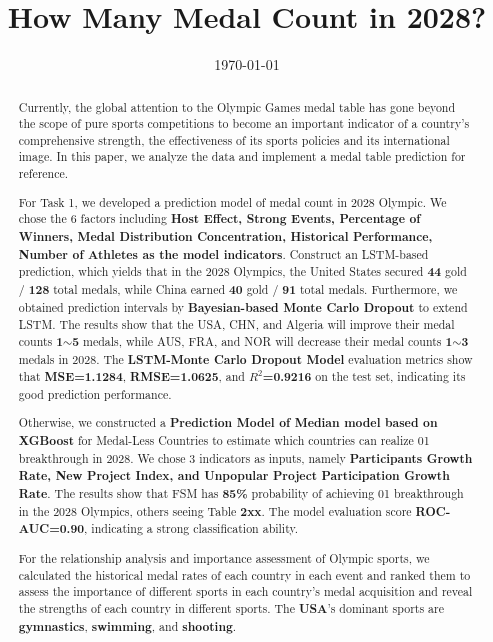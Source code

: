 \documentclass{mcmthesis}
\title{How Many Medal Count in 2028?}
\date{\today}
\begin{document}
	
	\begin{abstract}
	
	 Currently, the global attention to the Olympic Games medal table has gone beyond the scope of pure sports competitions to become an important indicator of a country's comprehensive strength, the effectiveness of its sports policies and its international image. In this paper, we analyze the data and implement a medal table prediction for reference.
	
	For Task 1, we developed a prediction model of medal count in 2028 Olympic. We chose the 6 factors including \textbf{Host Effect, Strong Events, Percentage of Winners, Medal Distribution Concentration, Historical Performance, Number of Athletes as the model indicators}. Construct an LSTM-based prediction, which yields that in the 2028 Olympics, the United States secured \textbf{44} gold / \textbf{128} total medals, while China earned \textbf{40} gold / \textbf{91} total medals. Furthermore, we obtained prediction intervals by \textbf{Bayesian-based Monte Carlo Dropout} to extend LSTM. The results show that the USA, CHN, and Algeria will improve their medal counts \textbf{1$\sim$5} medals, while AUS, FRA, and NOR will decrease their medal counts \textbf{1$\sim$3} medals in 2028. The \textbf{LSTM-Monte Carlo Dropout Model} evaluation metrics show that \textbf{MSE=1.1284}, \textbf{RMSE=1.0625}, and \textbf{$R^2$=0.9216} on the test set, indicating its good prediction performance.
	
	Otherwise, we constructed a \textbf{Prediction Model of Median model based on XGBoost} for Medal-Less Countries to estimate which countries can realize 01 breakthrough  in 2028. We chose 3 indicators as inputs, namely \textbf{Participants Growth Rate, New Project Index, and Unpopular Project Participation Growth Rate}. The results show that FSM has\textbf{ 85\%} probability of achieving 01 breakthrough in the 2028 Olympics, others seeing Table \textbf{2xx}. The model evaluation score \textbf{ROC-AUC=0.90}, indicating a strong classification ability. 
	
	
	For the relationship analysis and importance assessment of Olympic sports, we calculated the historical medal rates of each country in each event and ranked them to assess the importance of different sports in each country's medal acquisition and reveal the strengths of each country in different sports. The \textbf{USA}'s dominant sports are \textbf{gymnastics}, \textbf{swimming}, and \textbf{shooting}.
	

\end{abstract}
\end{document}

